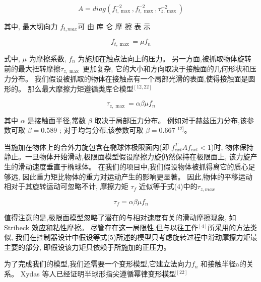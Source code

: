 \vspace{-15pt}
\begin{equation}
  A = diag\left( {f_{t,\max }^{ - 2},f_{t,\max }^{ - 2},\tau _{z,\max }^{ - 2}} \right)
\end{equation}

\noindent 其中, 最大切向力 $f_{t,max}$可 由 库 仑 摩 擦 表 示

\vspace{-15pt}
\begin{equation}
  {f_{t,\max }} = \mu {f_n}
\end{equation}

\noindent 式中, $\mu$ 为摩擦系数, $f_n$ 为施加在触点法向上的压力。
另一方面,被抓取物体旋转前的最大扭转摩擦${\tau _{z,\max }}$  更加复杂,
它的大小和方向取决于接触面的几何形状和压力分布。
我们假设被抓取的物体在接触点有一个局部光滑的表面,使得接触面是圆形的。
那么最大摩擦力矩遵循类库仑模型$^{[12, 22]}$

\vspace{-15pt}
\begin{equation}
  {\tau _{z,\max }} = \alpha \beta \mu {f_n}
\end{equation}

其中 $\alpha$ 是接触面半径,常数 $\beta$ 取决于局部压力分布。
例如对于赫兹压力分布,该参数可取 $\beta = 0.589$ ;
对于均匀分布,该参数可取 $\beta= 0.667$ $^{12]}$。

当施加在物体上的合外力旋包含在椭球体极限面内(即 $f_{ext}^TA{f_{ext}} < 1$)时,
物体保持静止。一旦物体开始滑动,极限面模型假设摩擦力旋仍然保持在极限面上,
该力旋产生的滑动速度垂直于椭球体。
在我们的项目中,我们假设物体被抓得离它的质心足够远,
因此重力矩比物体的重力对运动产生的影响更显著。
因此,物体的平移运动相对于其旋转运动可忽略不计,
摩擦力矩 $\tau_f$ 近似等于式(4)中的$\tau_{z,max}$

\vspace{-15pt}
\begin{equation}
  {\tau _f} = \alpha \beta \mu {f_n}
\end{equation}

值得注意的是,极限面模型忽略了潜在的与相对速度有关的滑动摩擦现象,
如 Stribeck 效应和粘性摩擦。
尽管存在这一局限性,但与以往工作$^{[4]}$所采用的方法类似,
我们在控制器设计中假设等式(5)所述的模型只考虑旋转过程中滑动摩擦力矩最主要的部分,
即假设该力矩只依赖于所施加的正压力。


为了完成我们的模型,我们还需要一个变形模型,它建立法向力$f_n$ 和接触半径a的关系。
Xydas 等人已经证明半球形指尖遵循幂律变形模型$^{[22]}$


